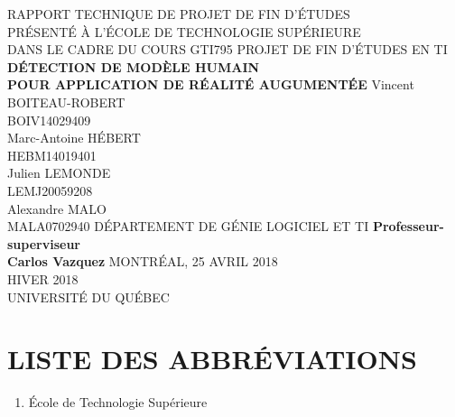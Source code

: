 \documentclass[letterpaper,twoside,12pt,french]{report}
\newcommand{\reportTitle}{\uppercase{Détection de modèle humain\\Pour application de réalité augumentée}}
\newcommand{\reportAuthors}{Vincent \uppercase{Boiteau-Robert\\BOIV14029409}\\Marc-Antoine \uppercase{Hébert\\HEBM14019401}\\Julien \uppercase{Lemonde\\LEMJ20059208}\\Alexandre \uppercase{Malo\\MALA0702940}}
\newcommand{\abbrItem}[2]{\item[\uppercase{\textbf{#1}} -] #2}
\begin{document}
\setlength{\parindent}{0cm}\setlength{\parskip}{2ex minus 0.2ex}
\begin{titlepage}
    \begin{center}
        \uppercase{Rapport technique de projet de fin d'études\\Présenté à l'école de technologie supérieure\\Dans le cadre du cours GTI795 Projet de fin d'études en TI}
        \vfill
        \textbf{\reportTitle}
        \vfill
        \reportAuthors
        \vfill
        \uppercase{Département de génie logiciel et TI}
        \vfill
        \textbf{Professeur-superviseur\\Carlos Vazquez}
        \vfill
        \uppercase{Montréal, 25 avril 2018\\Hiver 2018\\Université du Québec}
    \end{center}
\end{titlepage}
\cleardoublepage
\begin{abstract}
    \begin{center}
        \textbf{\uppercase{\Large{Résumé}}}
        \vspace{2ex}
        \\ \textbf{\reportTitle}
        \\ \vspace{1\baselineskip}
        \reportAuthors
        \\ \vspace{1\baselineskip}
        text résumé ici
    \end{center}
    \vspace{-\baselineskip}
\end{abstract}
\cleardoublepage
\tableofcontents
\cleardoublepage
\listoftables
\cleardoublepage
\listoffigures
\cleardoublepage
\chapter*{\uppercase{Liste des abbréviations}}
\begin{enumerate}
        \abbrItem{ÉTS}{École de Technologie Supérieure}
\end{enumerate}
\cleardoublepage
{}
\end{document}
